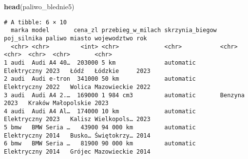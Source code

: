 \documentclass[
]{article}
\newenvironment{Shaded}{\begin{snugshade}}{\end{snugshade}}
\newcommand{\FunctionTok}[1]{\textcolor[rgb]{0.13,0.29,0.53}{\textbf{#1}}}
\newcommand{\NormalTok}[1]{#1}
\begin{document}
\begin{Shaded}
\begin{Highlighting}[]
\FunctionTok{head}\NormalTok{(paliwo\_blednie5)}
\end{Highlighting}
\end{Shaded}

\begin{verbatim}
# A tibble: 6 × 10
  marka model       cena_zl przebieg_w_milach skrzynia_biegow poj_silnika paliwo miasto wojewodztwo rok  
  <chr> <chr>         <int> <chr>             <chr>           <chr>       <chr>  <chr>  <chr>       <chr>
1 audi  Audi A4 40…  203000 5 km              automatic       Elektryczny 2023   Łódź   Łódzkie     2023 
2 audi  Audi e-tron  341000 50 km             automatic       Elektryczny 2022   Wolica Mazowieckie 2022 
3 audi  Audi A4 2.…  169000 1 984 cm3         automatic       Benzyna     2023   Kraków Małopolskie 2023 
4 audi  Audi A4 Al…  174000 10 km             automatic       Elektryczny 2023   Kalisz Wielkopols… 2023 
5 bmw   BMW Seria …   43900 94 000 km         automatic       Elektryczny 2014   Busko… Świętokrzy… 2014 
6 bmw   BMW Seria …   81900 90 000 km         automatic       Elektryczny 2014   Grójec Mazowieckie 2014 
\end{verbatim}
\end{document}
